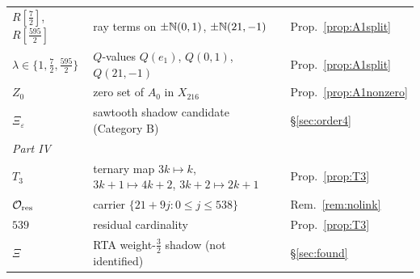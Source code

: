 \begin{center}
\begin{longtable}{p{3.2cm}p{9.3cm}p{2.4cm}}
$R[\frac72]$, $R[\frac{595}2]$ & ray terms on $\pm\mathbb{N}(0,1)$, $\pm\mathbb{N}(21,-1)$ & Prop.~\ref{prop:A1split}\\
$\lambda\in\{1,\frac72,\frac{595}2\}$ & $Q$-values $Q(e_1)$, $Q(0,1)$, $Q(21,-1)$ & Prop.~\ref{prop:A1split}\\
$Z_0$ & zero set of $A_0$ in $X_{216}$ & Prop.~\ref{prop:A1nonzero}\\
$\Xi_\varepsilon$ & sawtooth shadow candidate (Category B) & \S\ref{sec:order4}\\
\multicolumn{3}{l}{\emph{Part IV}}\\
$T_3$ & ternary map $3k\mapsto k$, $3k{+}1\mapsto4k{+}2$, $3k{+}2\mapsto2k{+}1$ & Prop.~\ref{prop:T3}\\
$\mathcal O_{\rm res}$ & carrier $\{21+9j:0\le j\le538\}$ & Rem.~\ref{rem:nolink}\\
$539$ & residual cardinality & Prop.~\ref{prop:T3}\\
$\Xi$ & RTA weight-$\frac32$ shadow (not identified) & \S\ref{sec:found}\\
\bottomrule
\end{longtable}
\end{center}
\clearpage
